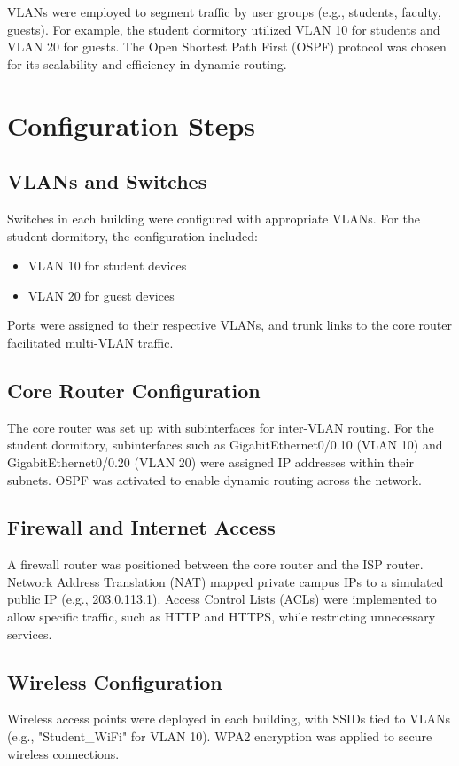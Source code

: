 \documentclass{article}
\begin{document}
VLANs were employed to segment traffic by user groups (e.g., students, faculty, guests). For example, the student dormitory utilized VLAN 10 for students and VLAN 20 for guests. The Open Shortest Path First (OSPF) protocol was chosen for its scalability and efficiency in dynamic routing.

\section{Configuration Steps}

\subsection{VLANs and Switches}
Switches in each building were configured with appropriate VLANs. For the student dormitory, the configuration included:
\begin{itemize}
	\item VLAN 10 for student devices
	\item VLAN 20 for guest devices
\end{itemize}
Ports were assigned to their respective VLANs, and trunk links to the core router facilitated multi-VLAN traffic.

\subsection{Core Router Configuration}
The core router was set up with subinterfaces for inter-VLAN routing. For the student dormitory, subinterfaces such as GigabitEthernet0/0.10 (VLAN 10) and GigabitEthernet0/0.20 (VLAN 20) were assigned IP addresses within their subnets. OSPF was activated to enable dynamic routing across the network.

\subsection{Firewall and Internet Access}
A firewall router was positioned between the core router and the ISP router. Network Address Translation (NAT) mapped private campus IPs to a simulated public IP (e.g., 203.0.113.1). Access Control Lists (ACLs) were implemented to allow specific traffic, such as HTTP and HTTPS, while restricting unnecessary services.

\subsection{Wireless Configuration}
Wireless access points were deployed in each building, with SSIDs tied to VLANs (e.g., "Student\_WiFi" for VLAN 10). WPA2 encryption was applied to secure wireless connections.
\end{document}

